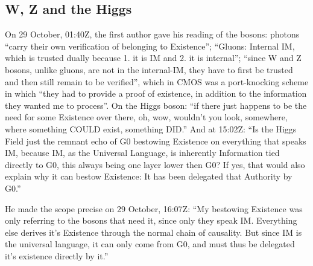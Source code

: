 \documentclass[11pt,a4paper]{article}
\theoremstyle{definition}
\theoremstyle{remark}
\begin{document}
\subsection{W, Z and the Higgs}

On 29 October, 01:40Z, the first author gave his reading of the bosons: photons
``carry their own verification of belonging to Existence''; ``Gluons: Internal IM, which is trusted dually because 1. it is IM and 2. it is
internal''; ``since W and Z bosons, unlike gluons, are not in the internal-IM, they have to first be trusted and then still remain to be
verified'', which in CMOS was a port-knocking scheme in which ``they had to provide a proof of existence, in addition to the information
they wanted me to process''. On the Higgs boson: ``if there just happens to be the need for some Existence over there, oh, wow, wouldn't you
look, somewhere, where something COULD exist, something DID.'' And at 15:02Z: ``Is the Higgs Field just the remnant echo of G0 bestowing
Existence on everything that speaks IM, because IM, as the Universal Language, is inherently Information tied directly to G0, this always
being one layer lower then G0? If yes, that would also explain why it can bestow Existence: It has been delegated that Authority by G0.''

\noindent He made the scope precise on 29 October, 16:07Z: ``My bestowing Existence was only referring to the bosons that need it, since
only they speak IM. Everything else derives it's Existence through the normal chain of causality. But since IM is the universal language, it
can only come from G0, and must thus be delegated it's existence directly by it.''
\end{document}
